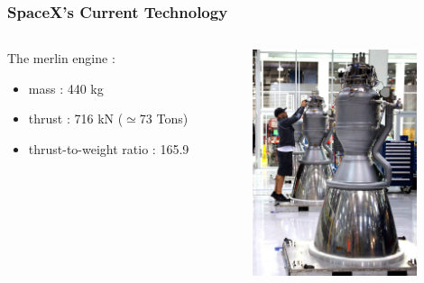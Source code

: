 {
    \logo{}

\begin{frame}
    \frametitle{SpaceX's Current Technology}
    \begin{columns}
        \begin{column}{60mm}
            The merlin engine :\\
            \vspace{1em}
            \begin{itemize}
                \item mass : 440 kg
                \item thrust : 716 kN ($\simeq$73 Tons)
                \item thrust-to-weight ratio : 165.9
            \end{itemize}
        \end{column}
        \begin{column}{45mm}
\includegraphics[width=48mm]{images/shiny_merlin}
        \end{column}
    \end{columns}
\end{frame}

}
